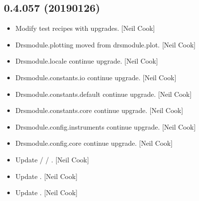 \documentclass[a4paper,10pt,english]{report}
\begin{document}
\subsection{0.4.057 (2019\sphinxhyphen{}01\sphinxhyphen{}26)}
\label{\detokenize{misc/changelog:id225}}\begin{itemize}
\item {} 
Modify test recipes with upgrades. {[}Neil Cook{]}

\item {} 
Drsmodule.plotting \sphinxhyphen{} moved from drsmodule.plot. {[}Neil Cook{]}

\item {} 
Drsmodule.locale \sphinxhyphen{} continue upgrade. {[}Neil Cook{]}

\item {} 
Drsmodule.constants.io \sphinxhyphen{} continue upgrade. {[}Neil Cook{]}

\item {} 
Drsmodule.constants.default \sphinxhyphen{} continue upgrade. {[}Neil Cook{]}

\item {} 
Drsmodule.constants.core \sphinxhyphen{} continue upgrade. {[}Neil Cook{]}

\item {} 
Drsmodule.config.instruments \sphinxhyphen{} continue upgrade. {[}Neil Cook{]}

\item {} 
Drsmodule.config.core \sphinxhyphen{} continue upgrade. {[}Neil Cook{]}

\item {} 
Update  /  / . {[}Neil Cook{]}

\item {} 
Update . {[}Neil Cook{]}

\item {} 
Update . {[}Neil Cook{]}

\end{itemize}
\end{document}
